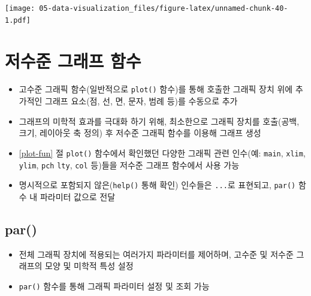 \documentclass[
  11pt,
]{krantz}
\newenvironment{Shaded}{\begin{snugshade}}{\end{snugshade}}
\newcommand{\CommentTok}[1]{\textcolor[rgb]{0.37,0.37,0.37}{\textit{#1}}}
\newcommand{\DecValTok}[1]{\textcolor[rgb]{0.06,0.06,0.06}{#1}}
\newcommand{\KeywordTok}[1]{\textcolor[rgb]{0.27,0.27,0.27}{\textbf{#1}}}
\newcommand{\NormalTok}[1]{#1}
\newcommand{\OperatorTok}[1]{\textcolor[rgb]{0.43,0.43,0.43}{\textbf{#1}}}
\newcommand{\StringTok}[1]{\textcolor[rgb]{0.5,0.5,0.5}{#1}}
\providecommand{\tightlist}{%
  \setlength{\itemsep}{0pt}\setlength{\parskip}{0pt}}
\begin{document}
\texttt{[image: 05-data-visualization\_files/figure-latex/unnamed-chunk-40-1.pdf]}

\normalsize

\hypertarget{low-level-graphic}{%
\section{저수준 그래프 함수}\label{low-level-graphic}}

\begin{itemize}
\tightlist
\item
  고수준 그래픽 함수(일반적으로 \texttt{plot()} 함수)를 통해 호출한 그래픽 장치 위에 추가적인 그래프 요소(점, 선, 면, 문자, 범례 등)를 수동으로 추가
\item
  그래프의 미학적 효과를 극대화 하기 위해, 최소한으로 그래픽 장치를 호출(공백, 크기, 레이아웃 축 정의) 후 저수준 그래픽 함수를 이용해 그래프 생성
\item
  \ref{plot-fun} 절 \texttt{plot()} 함수에서 확인했던 다양한 그래픽 관련 인수(예: \texttt{main}, \texttt{xlim}, \texttt{ylim}, \texttt{pch} \texttt{lty}, \texttt{col} 등)들을 저수준 그래프 함수에서 사용 가능
\item
  명시적으로 포함되지 않은(\texttt{help()} 통해 확인) 인수들은 \texttt{...}로 표현되고, \texttt{par()} 함수 내 파라미터 값으로 전달
\end{itemize}

\hypertarget{par}{%
\subsection{par()}\label{par}}

\begin{itemize}
\tightlist
\item
  전체 그래픽 장치에 적용되는 여러가지 파라미터를 제어하며, 고수준 및 저수준 그래프의 모양 및 미학적 특성 설정
\item
  \texttt{par()} 함수를 통해 그래픽 파라미터 설정 및 조회 가능
\end{itemize}

\footnotesize

\begin{Shaded}
\end{Shaded}
\end{document}
